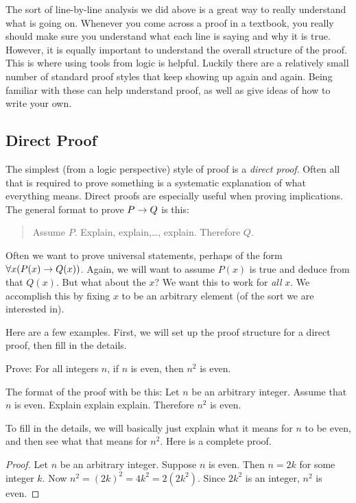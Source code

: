 \documentclass[12pt]{article}
\begin{document}
 

 
 The sort of line-by-line analysis we did above is a great way to really understand what is going on.  Whenever you come across a proof in a textbook, you really should make sure you understand what each line is saying and why it is true.  However, it is equally important to understand the overall structure of the proof.  This is where using tools from logic is helpful.  Luckily there are a relatively small number of standard proof styles that keep showing up again and again.  Being familiar with these can help understand proof, as well as give ideas of how to write your own.
 
 \subsection*{Direct Proof}
 
 The simplest (from a logic perspective) style of proof is a {\em direct proof}.  Often all that is required to prove something is a systematic explanation of what everything means.  Direct proofs are especially useful when proving implications.  The general format to prove $P \rightarrow Q$ is this:
 
 \begin{quote}
 Assume $P$.  Explain, explain,\ldots, explain.  Therefore $Q$.
 \end{quote}
 
 Often we want to prove universal statements, perhaps of the form $\forall x (P(x) \rightarrow Q(x))$.  Again, we will want to assume $P(x)$ is true and deduce from that $Q(x)$.  But what about the $x$?  We want this to work for {\em all} $x$.  We accomplish this by fixing $x$ to be an arbitrary element (of the sort we are interested in).  
 
 Here are a few examples.  First, we will set up the proof structure for a direct proof, then fill in the details.
 
 \begin{example}
 	Prove: For all integers $n$, if $n$ is even, then $n^2$ is even.
 	
 	\begin{solution}
	 	The format of the proof with be this: Let $n$ be an arbitrary integer.  Assume that $n$ is even.  Explain explain explain.  Therefore $n^2$ is even.
	 	
	 	To fill in the details, we will basically just explain what it means for $n$ to be even, and then see what that means for $n^2$.  Here is a complete proof.

 	   \begin{proof}
 	     Let $n$ be an arbitrary integer.  Suppose $n$ is even.  Then $n = 2k$ for some integer $k$.  Now $n^2 = (2k)^2 = 4k^2 = 2(2k^2)$.  Since $2k^2$ is an integer, $n^2$ is even.
 	   \end{proof}
 	\end{solution}
 \end{example}
 
\end{document}

